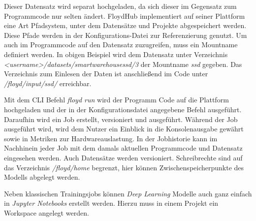 Dieser Datensatz wird separat hochgeladen, da sich dieser im Gegensatz zum Programmcode nur selten ändert. FloydHub implementiert auf seiner Plattform eine Art Pfadsystem, unter dem Datensätze und Projekte abgespeichert werden. Diese Pfade werden in der Konfigurations-Datei zur Referenzierung genutzt. Um auch im Programmcode auf den Datensatz zuzugreifen, muss ein Mountname definiert werden. In obigen Beispiel wird dem Datensatz unter Verzeichnis \textit{<username>/datasets/smartwarehousessd/3} der Mountname \textit{ssd} gegeben. Das Verzeichnis zum Einlesen der Daten ist anschließend im Code unter \textit{/floyd/input/ssd/} erreichbar. 

Mit dem CLI Befehl \textit{floyd run} wird der Programm Code auf die Plattform hochgeladen und der in der Konfigurationsdatei angegebene Befehl ausgeführt. Daraufhin wird ein Job erstellt, versioniert und ausgeführt. Während der Job ausgeführt wird, wird dem Nutzer ein Einblick in die Konsolenausgabe gewährt sowie in Metriken zur Hardwareauslastung. In der Jobhistorie kann im Nachhinein jeder Job mit dem damals aktuellen Programmcode und Datensatz eingesehen werden. Auch Datensätze werden versioniert. Schreibrechte sind auf das Verzeichnis \textit{/floyd/home} begrenzt, hier können Zwischenspeicherpunkte des Modells abgelegt werden. 

Neben klassischen Trainingsjobs können \textit{Deep Learning} Modelle auch ganz einfach in \textit{Jupyter Notebooks} erstellt werden. Hierzu muss in einem Projekt ein Workspace angelegt werden.

